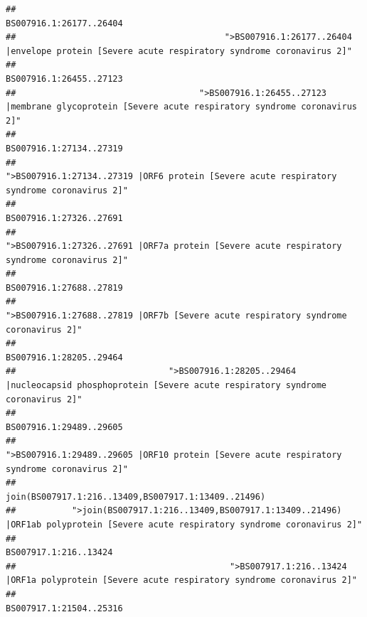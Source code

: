 \documentclass[
]{article}
\begin{document}
\begin{verbatim}
##                                                                                                                BS007916.1:26177..26404 
##                                         ">BS007916.1:26177..26404 |envelope protein [Severe acute respiratory syndrome coronavirus 2]" 
##                                                                                                                BS007916.1:26455..27123 
##                                    ">BS007916.1:26455..27123 |membrane glycoprotein [Severe acute respiratory syndrome coronavirus 2]" 
##                                                                                                                BS007916.1:27134..27319 
##                                             ">BS007916.1:27134..27319 |ORF6 protein [Severe acute respiratory syndrome coronavirus 2]" 
##                                                                                                                BS007916.1:27326..27691 
##                                            ">BS007916.1:27326..27691 |ORF7a protein [Severe acute respiratory syndrome coronavirus 2]" 
##                                                                                                                BS007916.1:27688..27819 
##                                                    ">BS007916.1:27688..27819 |ORF7b [Severe acute respiratory syndrome coronavirus 2]" 
##                                                                                                                BS007916.1:28205..29464 
##                              ">BS007916.1:28205..29464 |nucleocapsid phosphoprotein [Severe acute respiratory syndrome coronavirus 2]" 
##                                                                                                                BS007916.1:29489..29605 
##                                            ">BS007916.1:29489..29605 |ORF10 protein [Severe acute respiratory syndrome coronavirus 2]" 
##                                                                                    join(BS007917.1:216..13409,BS007917.1:13409..21496) 
##           ">join(BS007917.1:216..13409,BS007917.1:13409..21496) |ORF1ab polyprotein [Severe acute respiratory syndrome coronavirus 2]" 
##                                                                                                                  BS007917.1:216..13424 
##                                          ">BS007917.1:216..13424 |ORF1a polyprotein [Severe acute respiratory syndrome coronavirus 2]" 
##                                                                                                                BS007917.1:21504..25316 

\end{verbatim}
\end{document}
